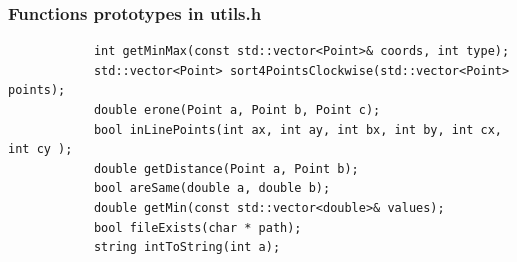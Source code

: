 			\newpage
			\subsubsection{Functions prototypes in utils.h}
			\begin{lstlisting}
			int getMinMax(const std::vector<Point>& coords, int type);
			std::vector<Point> sort4PointsClockwise(std::vector<Point> points);
			double erone(Point a, Point b, Point c);
			bool inLinePoints(int ax, int ay, int bx, int by, int cx, int cy );
			double getDistance(Point a, Point b);
			bool areSame(double a, double b);
			double getMin(const std::vector<double>& values);
			bool fileExists(char * path);
			string intToString(int a);
			\end{lstlisting}

			
